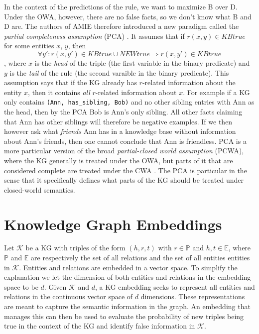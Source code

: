 In the context of the predictions of the rule, we want to maximize B over D. Under the OWA, however, there are no false facts, so we don't know what B and D are. The authors of AMIE therefore introduced a new paradigm called the \textit{partial completeness assumption} (PCA) \cite{amie}. It assumes that if $r(x, y) \in KB true$ for some entities $x$, $y$, then
\[\forall y' : r(x, y') \in KBtrue \cup NEWtrue \Rightarrow r(x, y') \in KBtrue\]
, where $x$ is the \textit{head} of the triple (the first variable in the binary predicate) and $y$ is the \textit{tail} of the rule (the second varaible in the binary predicate).
This assumption says that if the KG already has $r$-related information about the entity $x$,  then it contains \textit{all} $r$-related information about $x$. For example if a KG only contains \texttt{(Ann, has\_sibling, Bob)} and no other sibling entries with Ann as the head, then by the PCA Bob is Ann's only sibling. All other facts claiming that Ann has other siblings will therefore be negative examples. If we then however ask what \textit{friends} Ann has in a knowledge base without information about Ann's friends, then one cannot conclude that Ann is friendless. PCA is a more particular version of the broad \textit{partial-closed world assumption} (PCWA), where the KG generally is treated under the OWA, but parts of it that are considered complete are treated under the CWA \cite{motro1989integrity}. The PCA is particular in the sense that it specifically defines what parts of the KG should be treated under closed-world semantics.

\section{Knowledge Graph Embeddings}
\label{KG_embeddings}
Let $\mathcal{K}$ be a KG with triples of the form $(h, r, t)$ with $r\in \mathbb{P}$ and $h, t \in \mathbb{E}$, where $\mathbb{P}$ and $\mathbb{E}$ are respectively the set of all relations and the set of all entities entities in $\mathcal{K}$. Entities and relations are embedded in a vector space. To simplify the explanation we let the dimension of both entities and relations in the embedding space to be $d$.
Given $\mathcal{K}$ and $d$, a KG embedding seeks to represent all entities and relations in the continuous vector space of $d$ dimensions. These representations are meant to capture the semantic information in the graph. An embedding that manages this can then be used to evaluate the probability of new triples being true in the context of the KG and identify false information in $\mathcal{K}$.%

